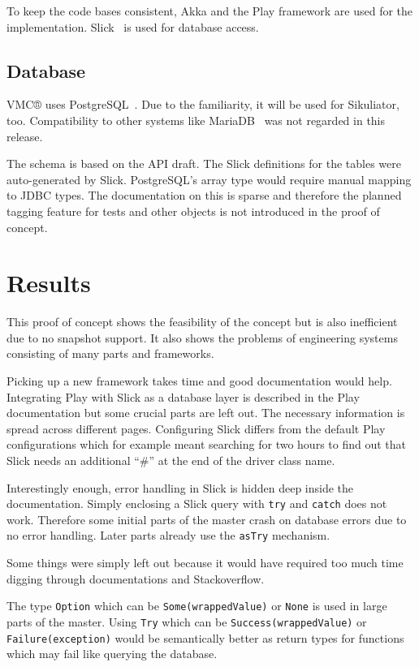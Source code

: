 \documentclass[a4paper,twocolumn,twoside]{article}
\newcommand{\VMC}[0]{VMC®}
\newcommand{\Sik}[0]{Sikuliator}
\begin{document}
To keep the code bases consistent, Akka and the Play framework are used for the implementation.
Slick~\cite{Slick} is used for database access.

\subsection{Database}
\VMC{} uses PostgreSQL~\cite{PostgreSQL}.
Due to the familiarity, it will be used for \Sik{}, too.
Compatibility to other systems like MariaDB~\cite{MariaDB} was not regarded in this release.

The schema is based on the API draft.
The Slick definitions for the tables were auto-generated by Slick.
PostgreSQL's array type would require manual mapping to JDBC types.
The documentation on this is sparse and therefore the planned tagging feature for tests and other objects is not introduced in the proof of concept.


\section{Results}
This proof of concept shows the feasibility of the concept but is also inefficient due to no snapshot support.
It also shows the problems of engineering systems consisting of many parts and frameworks.

Picking up a new framework takes time and good documentation would help.
Integrating Play with Slick as a database layer is described in the Play documentation but some crucial parts are left out.
The necessary information is spread across different pages.
Configuring Slick differs from the default Play configurations which for example meant searching for two hours to find out that Slick needs an additional \enquote{\#} at the end of the driver class name.

Interestingly enough, error handling in Slick is hidden deep inside the documentation.
Simply enclosing a Slick query with \texttt{try} and \texttt{catch} does not work.
Therefore some initial parts of the master crash on database errors due to no error handling.
Later parts already use the \texttt{asTry} mechanism.

Some things were simply left out because it would have required too much time digging through documentations and Stackoverflow.

The type \texttt{Option} which can be \texttt{Some(wrappedValue)} or \texttt{None} is used in large parts of the master.
Using \texttt{Try} which can be \texttt{Success(wrappedValue)} or \texttt{Failure(exception)} would be semantically better as return types for functions which may fail like querying the database.
\end{document}
